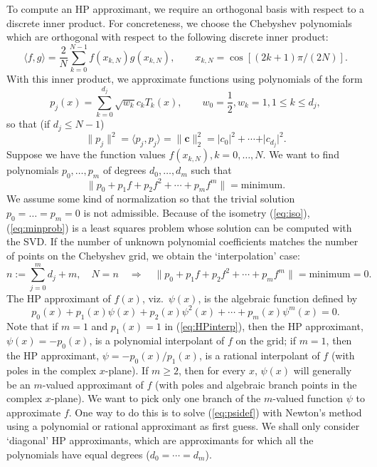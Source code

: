 \documentclass[12pt,a4paper]{article}
\begin{document}
To compute an HP approximant, we require an orthogonal basis with respect to a discrete inner product. For concreteness, we choose the Chebyshev polynomials which are orthogonal with respect to the following discrete inner product:
\begin{equation}
\langle f, g \rangle =\frac{2}{N} \sum_{k=0}^{N-1} f(x_{k,N})g(x_{k,N}), \qquad x_{k,N} = \cos\left[(2k+1)\pi/(2N)\right].  \label{eq:ipdef}
\end{equation}
With this inner product, we approximate functions using polynomials of the form
\begin{equation*}
p_j (x)= \sum_{k = 0}^{d_j}\sqrt{w_k} c_k T_k(x), \qquad w_0 = \frac{1}{2}, w_k = 1,  1 \leq k \leq d_j,
\end{equation*}
so that (if $d_j \leq N-1$)
\begin{equation}
\| p_j \|^2 = \langle p_j, p_j \rangle = \| \bm{c} \|_2^2 = \vert c_0 \vert^2 + \cdots + \vert c_{d_j} \vert^2. \label{eq:iso}
\end{equation}
Suppose we have the function values $f(x_{k,N}), k = 0, \ldots, N$. We want to find polynomials $p_0, \ldots, p_m$ of degrees $d_0, \ldots, d_m$ such that 
\begin{equation}
\| p_0 + p_1 f + p_2 f^2 + \cdots + p_m f^m \| = \text{minimum}. \label{eq:minprob}
\end{equation}
We assume some kind of normalization so that the trivial solution $p_0 = \ldots = p_m = 0$ is not admissible. Because of the isometry (\ref{eq:iso}), (\ref{eq:minprob}) is a least squares problem whose solution can be computed with the SVD. If the number of unknown polynomial coefficients matches the number of points on the Chebyshev grid, we obtain the `interpolation' case:
\begin{equation}
n := \sum_{j =0}^{m}d_j + m, \quad N = n \quad \Rightarrow \quad \| p_0 + p_1 f + p_2f^2 + \cdots + p_mf^m \| = \text{minimum} = 0. \label{eq:HPinterp}
\end{equation}
The HP approximant of $f(x)$, viz.~$\psi(x)$, is the algebraic function defined by
\begin{equation}
p_0(x) + p_1(x) \psi(x) + p_2(x) \psi^2(x) + \cdots + p_m(x) \psi^m(x) = 0. \label{eq:psidef}
\end{equation}
Note that if $m=1$ and $p_1(x) = 1$ in (\ref{eq:HPinterp}), then the HP approximant, $\psi(x) = -p_0(x)$, is a polynomial interpolant of $f$ on the grid; if $m=1$, then the HP approximant, $\psi = -p_0(x)/p_1(x)$, is a rational interpolant of $f$ (with poles in the complex $x$-plane). If $m \geq 2$, then for every $x$, $\psi(x)$ will generally be an $m$-valued approximant of $f$ (with poles and algebraic branch points in the complex $x$-plane). We want to pick only one branch of the $m$-valued function $\psi$ to approximate $f$. One way to do this is to solve (\ref{eq:psidef}) with Newton's method using a polynomial or rational approximant as first guess. We shall only consider `diagonal' HP approximants, which are approximants for which all the polynomials have equal degrees ($d_0 = \cdots = d_m$).
\end{document}
